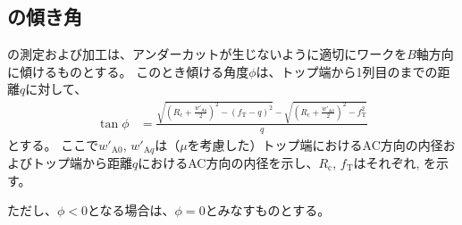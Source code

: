 \subsection{\DimpleMilling の傾き角}
\Dimple の測定および加工は、アンダーカットが生じないように適切にワークを$B$軸方向に傾けるものとする。
このとき傾ける角度$\phi$は、トップ端から1列目の\nameDimple までの距離$q$に対して、
\begin{align*}
  \tan\phi
  &= \frac{\displaystyle
           \sqrt{\left(R_\mathrm c+\frac{w'_{\mathrm Aq}}2\right)^2-(f_\mathrm T-q)^2}
           -\sqrt{\left(R_\mathrm c+\frac{w'_{\mathrm A0}}2\right)^2-f_\mathrm T^2}}q
\end{align*}
とする。
ここで$w'_{\mathrm A0}$, $w'_{\mathrm Aq}$は（\PlatingThk$\mu$を考慮した）トップ端におけるAC方向の内径およびトップ端から距離$q$におけるAC方向の内径を示し、$R_\mathrm c$, $f_\mathrm T$はそれぞれ\CenterCurvatureRadius, \TopAlocationLength を示す。

ただし、$\phi < 0$となる場合は、$\phi = 0$とみなすものとする。


